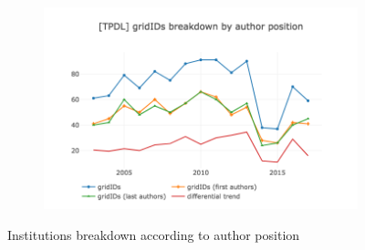 \documentclass{llncs}
\begin{document}
\begin{figure}[t]
\begin{subfigure}{.5\textwidth}
	\includegraphics[width=\textwidth]{images/tpdl_gridids_vs_authors.png}
	\caption[ ]{}
	\label{fig:tpdl_gridids_vs_authors}
\end{subfigure}
\caption{Institutions breakdown according to author position}
\label{fig:gridids_vs_authors}
\end{figure}
\end{document}
